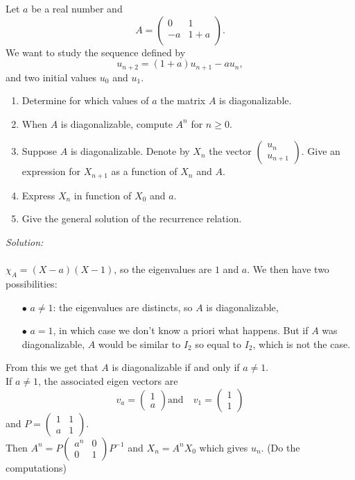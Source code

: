 \begin{Pb}
Let $a$ be a real number and
\[A= \begin{pmatrix}
 0 & 1  \\
-a & 1+a \\
\end{pmatrix}.\]
We want to study the sequence defined by \[u_{n+2}= (1+a)u_{n+1}-au_n,\]
and two initial values $u_0$ and $u_1$.
\begin{enumerate}	
\item Determine for which values of $a$ the matrix $A$ is diagonalizable.
\item When $A$ is diagonalizable, compute $A^n$ for $n\geq 0$.
\item Suppose $A$ is diagonalizable. Denote by $X_n$ the vector $\begin{pmatrix} u_n \\ u_{n+1} \end{pmatrix}$. Give an expression for $X_{n+1}$ as a function of $X_n$ and $A$. 
\item Express $X_n$ in function of $X_0$ and $a$.
\item Give the general solution of the recurrence relation.\\
\end{enumerate}

\textit{Solution:}\\
\\
$\chi_A = (X-a)(X-1)$, so the eigenvalues are $1$ and $a$. We then have two possibilities:
\begin{itemize}
\item[$\bullet$] $a\neq 1$: the eigenvalues are distincts, so $A$ is diagonalizable,
\item[$\bullet$] $a=1$, in which case we don't know a priori what happens. But if $A$ was diagonalizable, $A$ would be similar to $I_2$ so equal to $I_2$, which is not the case.
\end{itemize}
From this we get that $A$ is diagonalizable if and only if $a\neq 1$.\\

If $a\neq 1$, the associated eigen vectors are
\[ v_a= \begin{pmatrix}1 \\ a \end{pmatrix} \text{and} \quad v_1= \begin{pmatrix}1 \\ 1 \end{pmatrix}\]
and $P = \begin{pmatrix} 1 & 1 \\ a & 1 \end{pmatrix}$.\\
Then $A^n = P \begin{pmatrix} a^n & 0 \\ 0 & 1 \end{pmatrix} P^{-1}$ and $X_n = A^n X_0$ which gives $u_n$. (Do the computations)\\
\end{Pb}

